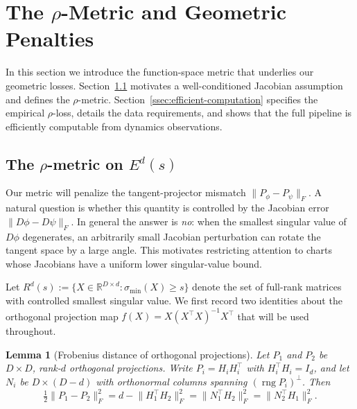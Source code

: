\documentclass[11pt]{article}
\newcommand{\R}{\mathbb{R}}
\newcommand{\rng}{\operatorname{rng}}
\newcommand{\norm}[1]{\lVert#1\rVert}
\newcommand{\sigmin}{\sigma_{\min}}
\newtheorem{lem}[thm]{Lemma}
\begin{document}
\section{The \texorpdfstring{$\rho$}{rho}-Metric and Geometric Penalties}\label{sec:rho-metric}

In this section we introduce the function-space metric
that underlies our geometric losses.
Section~\ref{ssec:rho-metric-def} motivates a well-conditioned
Jacobian assumption and defines the $\rho$-metric.
Section~\ref{ssec:efficient-computation} specifies the empirical
$\rho$-loss, details the data requirements, and shows that the
full pipeline is efficiently computable from dynamics observations.

\subsection{The \texorpdfstring{$\rho$}{rho}-metric on
  \texorpdfstring{$E^d(s)$}{Ed(s)}}\label{ssec:rho-metric-def}

Our metric will penalize the tangent-projector mismatch
$\norm{P_\phi-P_\psi}_F$.
A natural question is whether this quantity is controlled by the
Jacobian error $\norm{D\phi-D\psi}_F$.
In general the answer is \emph{no}: when the smallest singular value of
$D\phi$ degenerates, an arbitrarily small Jacobian perturbation can
rotate the tangent space by a large angle.
This motivates restricting attention to charts whose Jacobians have a
uniform lower singular-value bound.

Let $R^d(s):=\{X\in\R^{D\times d}:\sigmin(X)\ge s\}$
denote the set of full-rank matrices with controlled smallest singular value.
We first record two identities about the orthogonal
projection map $f(X) = X(X^\top X)^{-1}X^\top$ that
will be used throughout.

\begin{lem}[Frobenius distance of orthogonal projections]\label{lem:OP-frob-distance}
  Let $P_1$ and $P_2$ be $D\times D$, rank-$d$
  orthogonal projections.
  Write $P_i = H_i H_i^\top$ with $H_i^\top H_i = I_d$,
  and let $N_i$ be $D\times(D-d)$ with orthonormal
  columns spanning $(\rng P_i)^\perp$.
  Then
  \[
    \tfrac{1}{2}\norm{P_1-P_2}_F^2
    = d - \norm{H_1^\top H_2}_F^2
    = \norm{N_1^\top H_2}_F^2
    = \norm{N_2^\top H_1}_F^2.
  \]
\end{lem}
\end{document}

